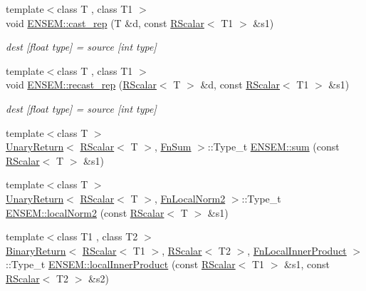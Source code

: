 \begin{DoxyCompactItemize}
{\footnotesize template$<$class T , class T1 $>$ }\\void \mbox{\hyperlink{group__rscalar_ga7fc2c1b07bacdd72df1204c120ace7a0}{E\+N\+S\+E\+M\+::cast\+\_\+rep}} (T \&d, const \mbox{\hyperlink{classENSEM_1_1RScalar}{R\+Scalar}}$<$ T1 $>$ \&s1)
\begin{DoxyCompactList}\small\item\em dest \mbox{[}float type\mbox{]} = source \mbox{[}int type\mbox{]} \end{DoxyCompactList}\item 
{\footnotesize template$<$class T , class T1 $>$ }\\void \mbox{\hyperlink{group__rscalar_ga1ecb21d4e8fc1e664055d3fa1145f6e9}{E\+N\+S\+E\+M\+::recast\+\_\+rep}} (\mbox{\hyperlink{classENSEM_1_1RScalar}{R\+Scalar}}$<$ T $>$ \&d, const \mbox{\hyperlink{classENSEM_1_1RScalar}{R\+Scalar}}$<$ T1 $>$ \&s1)
\begin{DoxyCompactList}\small\item\em dest \mbox{[}float type\mbox{]} = source \mbox{[}int type\mbox{]} \end{DoxyCompactList}\item 
{\footnotesize template$<$class T $>$ }\\\mbox{\hyperlink{structENSEM_1_1UnaryReturn}{Unary\+Return}}$<$ \mbox{\hyperlink{classENSEM_1_1RScalar}{R\+Scalar}}$<$ T $>$, \mbox{\hyperlink{structENSEM_1_1FnSum}{Fn\+Sum}} $>$\+::Type\+\_\+t \mbox{\hyperlink{group__rscalar_ga53401bdacfb693c17335cacfc5e9f6dd}{E\+N\+S\+E\+M\+::sum}} (const \mbox{\hyperlink{classENSEM_1_1RScalar}{R\+Scalar}}$<$ T $>$ \&s1)
\item 
{\footnotesize template$<$class T $>$ }\\\mbox{\hyperlink{structENSEM_1_1UnaryReturn}{Unary\+Return}}$<$ \mbox{\hyperlink{classENSEM_1_1RScalar}{R\+Scalar}}$<$ T $>$, \mbox{\hyperlink{structENSEM_1_1FnLocalNorm2}{Fn\+Local\+Norm2}} $>$\+::Type\+\_\+t \mbox{\hyperlink{group__rscalar_ga3ca325ab0808bb3c4b966320b923c213}{E\+N\+S\+E\+M\+::local\+Norm2}} (const \mbox{\hyperlink{classENSEM_1_1RScalar}{R\+Scalar}}$<$ T $>$ \&s1)
\item 
{\footnotesize template$<$class T1 , class T2 $>$ }\\\mbox{\hyperlink{structENSEM_1_1BinaryReturn}{Binary\+Return}}$<$ \mbox{\hyperlink{classENSEM_1_1RScalar}{R\+Scalar}}$<$ T1 $>$, \mbox{\hyperlink{classENSEM_1_1RScalar}{R\+Scalar}}$<$ T2 $>$, \mbox{\hyperlink{structENSEM_1_1FnLocalInnerProduct}{Fn\+Local\+Inner\+Product}} $>$\+::Type\+\_\+t \mbox{\hyperlink{group__rscalar_gadd76bb3801e8a4665498325bf9c7f6ae}{E\+N\+S\+E\+M\+::local\+Inner\+Product}} (const \mbox{\hyperlink{classENSEM_1_1RScalar}{R\+Scalar}}$<$ T1 $>$ \&s1, const \mbox{\hyperlink{classENSEM_1_1RScalar}{R\+Scalar}}$<$ T2 $>$ \&s2)

\end{DoxyCompactItemize}
